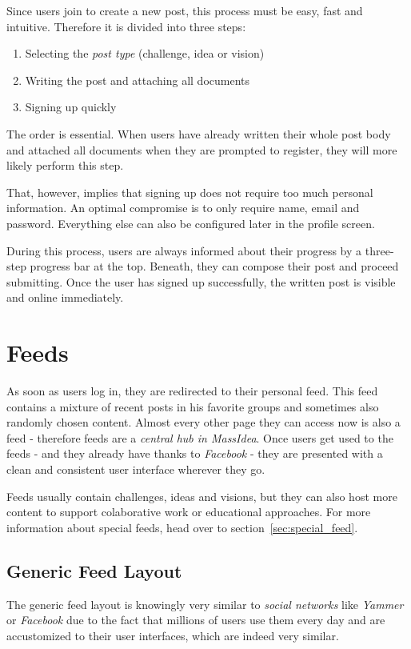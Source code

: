 \documentclass[a4paper, notitlepage, oneside]{article}
\begin{document}
Since users join to create a new post, this process must be easy, fast and intuitive. Therefore it is divided into three steps:

\begin{enumerate}
	\item Selecting the \emph{post type} (challenge, idea or vision)
	\item Writing the post and attaching all documents
	\item Signing up quickly
\end{enumerate}

The order is essential. When users have already written their whole post body and attached all documents when they are prompted to register, they will more likely perform this step. 

That, however, implies that signing up does not require too much personal information. An optimal compromise is to only require name, email and password. Everything else can also be configured later in the profile screen.

During this process, users are always informed about their progress by a three-step progress bar at the top. Beneath, they can compose their post and proceed submitting. Once the user has signed up successfully, the written post is visible and online immediately.

\section{Feeds}
\label{sec:feeds}

As soon as users log in, they are redirected to their personal feed. This feed contains a mixture of recent posts in his favorite groups and sometimes also randomly chosen content. Almost every other page they can access now is also a feed - therefore feeds are a \emph{central hub in MassIdea}. Once users get used to the feeds - and they already have thanks to \emph{Facebook} - they are presented with a clean and consistent user interface wherever they go.

Feeds usually contain challenges, ideas and visions, but they can also host more content to support colaborative work or educational approaches. For more information about special feeds, head over to section~\ref{sec:special_feed}.

\subsection{Generic Feed Layout}
The generic feed layout is knowingly very similar to \emph{social networks} like \emph{Yammer} or \emph{Facebook} due to the fact that millions of users use them every day and are accustomized to their user interfaces, which are indeed very similar.
\end{document}
